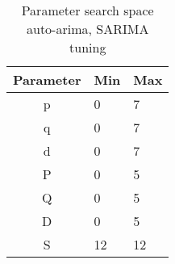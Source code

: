 \begin{table}[h]
  \centering
  \caption{Parameter search space auto-arima, SARIMA tuning}
  \label{table:method:arima-tuning}
  \begin{tabular}{|c|l|l|}\hline
    Parameter & Min & Max \\ \hline
    p         & 0   & 7   \\ \hline
    q         & 0   & 7   \\ \hline
    d         & 0   & 7   \\ \hline
    P         & 0   & 5   \\ \hline
    Q         & 0   & 5   \\ \hline
    D         & 0   & 5   \\ \hline
    S         & 12  & 12  \\ \hline
  \end{tabular}
\end{table}











